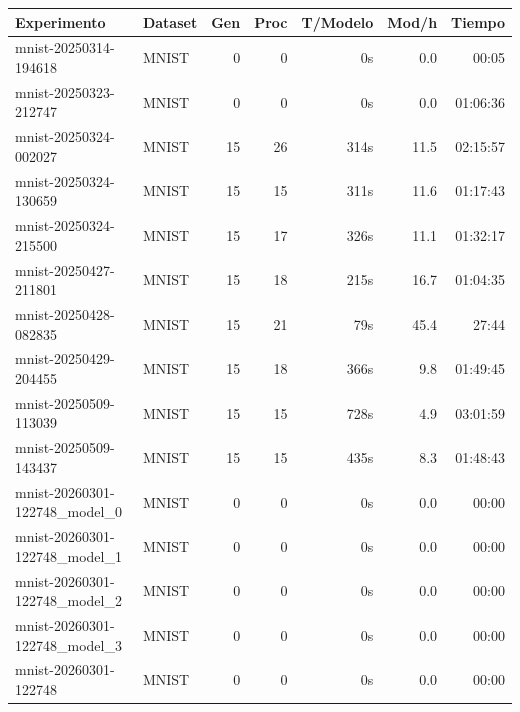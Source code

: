 \begin{tabular}{llrrrrr}
\toprule
Experimento & Dataset & Gen & Proc & T/Modelo & Mod/h & Tiempo \\
\midrule
mnist-20250314-194618 & MNIST & 0 & 0 & 0s & 0.0 & 00:05 \\
mnist-20250323-212747 & MNIST & 0 & 0 & 0s & 0.0 & 01:06:36 \\
mnist-20250324-002027 & MNIST & 15 & 26 & 314s & 11.5 & 02:15:57 \\
mnist-20250324-130659 & MNIST & 15 & 15 & 311s & 11.6 & 01:17:43 \\
mnist-20250324-215500 & MNIST & 15 & 17 & 326s & 11.1 & 01:32:17 \\
mnist-20250427-211801 & MNIST & 15 & 18 & 215s & 16.7 & 01:04:35 \\
mnist-20250428-082835 & MNIST & 15 & 21 & 79s & 45.4 & 27:44 \\
mnist-20250429-204455 & MNIST & 15 & 18 & 366s & 9.8 & 01:49:45 \\
mnist-20250509-113039 & MNIST & 15 & 15 & 728s & 4.9 & 03:01:59 \\
mnist-20250509-143437 & MNIST & 15 & 15 & 435s & 8.3 & 01:48:43 \\
mnist-20260301-122748_model_0 & MNIST & 0 & 0 & 0s & 0.0 & 00:00 \\
mnist-20260301-122748_model_1 & MNIST & 0 & 0 & 0s & 0.0 & 00:00 \\
mnist-20260301-122748_model_2 & MNIST & 0 & 0 & 0s & 0.0 & 00:00 \\
mnist-20260301-122748_model_3 & MNIST & 0 & 0 & 0s & 0.0 & 00:00 \\
mnist-20260301-122748 & MNIST & 0 & 0 & 0s & 0.0 & 00:00 \\
\bottomrule
\end{tabular}